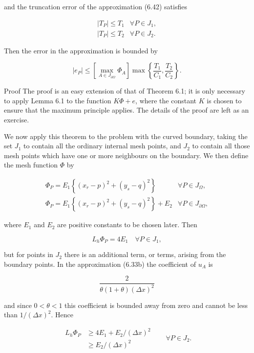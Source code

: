 \documentclass[10pt]{article}
\begin{document}
and the truncation error of the approximation (6.42) satisfies

\[
\begin{array}{ll}
\left|T_{P}\right| \leq T_{1} & \forall P \in J_{1}, \\
\left|T_{P}\right| \leq T_{2} & \forall P \in J_{2} .
\end{array}
\]

Then the error in the approximation is bounded by

\[
\left|e_{P}\right| \leq\left[\max _{A \in J_{\partial \Omega}} \Phi_{A}\right] \max \left\{\frac{T_{1}}{C_{1}}, \frac{T_{2}}{C_{2}}\right\} .
\]

Proof The proof is an easy extension of that of Theorem 6.1; it is only necessary to apply Lemma 6.1 to the function \(K \Phi+e\), where the constant \(K\) is chosen to ensure that the maximum principle applies. The details of the proof are left as an exercise.

We now apply this theorem to the problem with the curved boundary, taking the set \(J_{1}\) to contain all the ordinary internal mesh points, and \(J_{2}\) to contain all those mesh points which have one or more neighbours on the boundary. We then define the mesh function \(\Phi\) by

\[
\begin{array}{ll}
\Phi_{P}=E_{1}\left\{\left(x_{r}-p\right)^{2}+\left(y_{s}-q\right)^{2}\right\} & \forall P \in J_{\Omega}, \\
\Phi_{P}=E_{1}\left\{\left(x_{r}-p\right)^{2}+\left(y_{s}-q\right)^{2}\right\}+E_{2} & \forall P \in J_{\partial \Omega},
\end{array}
\]

where \(E_{1}\) and \(E_{2}\) are positive constants to be chosen later. Then

\[
L_{h} \Phi_{P}=4 E_{1} \quad \forall P \in J_{1},
\]

but for points in \(J_{2}\) there is an additional term, or terms, arising from the boundary points. In the approximation (6.33b) the coefficient of \(u_{A}\) is

\[
\frac{2}{\theta(1+\theta)(\Delta x)^{2}}
\]

and since \(0<\theta<1\) this coefficient is bounded away from zero and cannot be less than \(1 /(\Delta x)^{2}\). Hence

\[
\begin{array}{rlr}
L_{h} \Phi_{P} & \geq 4 E_{1}+E_{2} /(\Delta x)^{2} & \\
& \geq E_{2} /(\Delta x)^{2}
\end{array} \quad \forall P \in J_{2} .
\]
\end{document}
